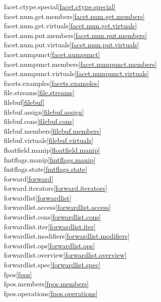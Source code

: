 \begin{multicols}{2}
facet.ctype.special\quad\ref{facet.ctype.special}\\
facet.num.get.members\quad\ref{facet.num.get.members}\\
facet.num.get.virtuals\quad\ref{facet.num.get.virtuals}\\
facet.num.put.members\quad\ref{facet.num.put.members}\\
facet.num.put.virtuals\quad\ref{facet.num.put.virtuals}\\
facet.numpunct\quad\ref{facet.numpunct}\\
facet.numpunct.members\quad\ref{facet.numpunct.members}\\
facet.numpunct.virtuals\quad\ref{facet.numpunct.virtuals}\\
facets.examples\quad\ref{facets.examples}\\
file.streams\quad\ref{file.streams}\\
filebuf\quad\ref{filebuf}\\
filebuf.assign\quad\ref{filebuf.assign}\\
filebuf.cons\quad\ref{filebuf.cons}\\
filebuf.members\quad\ref{filebuf.members}\\
filebuf.virtuals\quad\ref{filebuf.virtuals}\\
floatfield.manip\quad\ref{floatfield.manip}\\
fmtflags.manip\quad\ref{fmtflags.manip}\\
fmtflags.state\quad\ref{fmtflags.state}\\
forward\quad\ref{forward}\\
forward.iterators\quad\ref{forward.iterators}\\
forwardlist\quad\ref{forwardlist}\\
forwardlist.access\quad\ref{forwardlist.access}\\
forwardlist.cons\quad\ref{forwardlist.cons}\\
forwardlist.iter\quad\ref{forwardlist.iter}\\
forwardlist.modifiers\quad\ref{forwardlist.modifiers}\\
forwardlist.ops\quad\ref{forwardlist.ops}\\
forwardlist.overview\quad\ref{forwardlist.overview}\\
forwardlist.spec\quad\ref{forwardlist.spec}\\
fpos\quad\ref{fpos}\\
fpos.members\quad\ref{fpos.members}\\
fpos.operations\quad\ref{fpos.operations}\\

\end{multicols}
